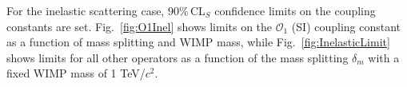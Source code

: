 

For the inelastic scattering case, 90\%\,CL$_S$ confidence limits on the coupling constants are set. Fig.~\ref{fig:O1Inel} shows limits on the $\mathcal{O}_1$ (SI) coupling constant as a function of mass splitting and WIMP mass, while Fig.~\ref{fig:InelasticLimit} shows limits for all other operators as a function of the mass splitting $\delta_m$ with a fixed WIMP mass of 1 TeV/$c^2$.  





